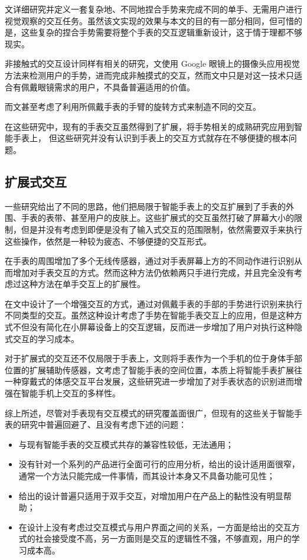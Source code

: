 文\cite{loclair2010pinchwatch}详细研究并定义一套复杂地、不同地捏合手势来完成不同的单手、无需用户进行视觉观察的交互任务。虽然该文实现的效果与本文的目的有一部分相同，但可惜的是，这些复杂的捏合手势需要将整个手表的交互逻辑重新设计，这于情于理都不够现实。

非接触式的交互设计同样有相关的研究，文\cite{lv2015extending}使用 Google 眼镜上的摄像头应用视觉方法来检测用户的手势，进而完成非触摸式的交互，然而文中只是对这一技术只适合有佩戴眼镜需求的用户，不具备普遍适用的价值。

而文\cite{Kerber:2015:WPM:2836041.2836063}甚至考虑了利用所佩戴手表的手臂的旋转方式来制造不同的交互。

在这些研究中，现有的手表交互虽然得到了扩展，将手势相关的成熟研究应用到智能手表上，
但这些研究并没有认识到手表上的交互方式就存在不够便捷的根本问题。

\subsection{扩展式交互}

一些研究给出了不同的思路，他们把局限于智能手表上的交互扩展到了手表的外围\cite{Knibbe:2014:EIS:2559206.2581315,Kratz:2009:HEA:1613858.1613912}、手表的表带\cite{Perrault:2013:WSG:2470654.2466192}、甚至用户的皮肤上\cite{Ogata:2015:SSG:2735711.2735830}。这些扩展式的交互虽然打破了屏幕大小的限制，但是并没有考虑到即便是没有了输入式交互的范围限制，依然需要双手来执行这些操作，依然是一种较为疲态、不够便捷的交互形式。

\cite{kim2007gesture}在手表的周围增加了多个无线传感器，通过对手表屏幕上方的不同动作进行识别从而增加对手表交互的方式。然而这种方法仍依赖两只手进行完成，并且完全没有考虑过这种方法在单手交互上的扩展性。

在文\cite{Yang:2015:EST:2815585.2815724}中设计了一个增强交互的方式，通过对佩戴手表的手部的手势进行识别来执行不同类型的交互。虽然这种设计考虑了手势在智能手表交互上的应用，但是这种方式不但没有简化在小屏幕设备上的交互逻辑，反而进一步增加了用户对执行这种隐式交互的学习成本。

对于扩展式的交互还不仅局限于手表上，文\cite{Chen:2014:DEJ:2556288.2556955}则将手表作为一个手机的位于身体手部位置的扩展辅助传感器，文\cite{Yang:2014:MIS:2638728.2638848}考虑了智能手表的空间位置，本质上将智能手表扩展往一种穿戴式的体感交互平台发展\cite{fuquanjun2015}，这些研究进一步增加了对手表状态的识别进而增强在智能手机上交互的多样性。

综上所述，尽管对手表现有交互模式的研究覆盖面很广，但现有的这些关于智能手表的研究中普遍回避了、且没有考虑下述的问题：
\begin{itemize}
    \kaishu
    \item 与现有智能手表的交互模式共存的兼容性较低，无法通用；
    \item 没有针对一个系列的产品进行全面可行的应用分析，给出的设计适用面很窄，通常一个方法只能完成一件事情，而其设计本身又不具备功能可见性；
    \item 给出的设计普遍只适用于双手交互，对增加用户在产品上的黏性没有明显帮助；
    \item 在设计上没有考虑过交互模式与用户界面之间的关系，一方面是给出的交互方式的社会接受度不高，另一方面则是交互的逻辑性不强，不够直观，用户的学习成本高。
\end{itemize}

\cleardoublepage
